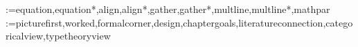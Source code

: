 \@for\artfbkenv:={equation,equation*,align,align*,gather,gather*,multline,multline*,mathpar}\do{%
  \expandafter\AtEndEnvironment\expandafter{\artfbkenv}{\ifdefined\artfbknoL\else\artfbkmark{L}{any}{}\fi}}
\def\artfbk@figure{figure}\def\artfbk@table{table}
\newcommand\artfbkfloat{\ifdefined\artfbknoF\else\artfbkfloatmark\fi}
\newcommand\artfbkfloatmark{\ifnum0\ifx\@currenvir\artfbk@figure1\fi\ifx\@currenvir\artfbk@table1\fi>0
  \begingroup\def\artfbkid{0}\artfbkmark{F}{float}{\@currentlabel}\endgroup\fi}
\makeatother
{}
\makeatletter\@for\artfbkenv:={picturefirst,worked,formalcorner,design,chaptergoals,literatureconnection,categoricalview,typetheoryview}\do{%
  \expandafter\AtBeginEnvironment\expandafter{\artfbkenv}{\artfbknew}}
\makeatother

